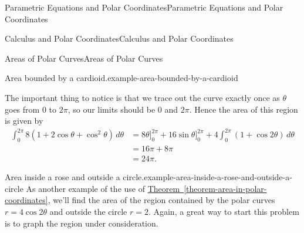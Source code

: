 \documentclass[10pt,]{book}
\numberwithin{equation}{section}
\begin{document}
\begin{chapterptx}{Parametric Equations and Polar Coordinates}{}{Parametric Equations and Polar Coordinates}{}{}
\begin{sectionptx}{Calculus and Polar Coordinates}{}{Calculus and Polar Coordinates}{}{}
\begin{subsectionptx}{Areas of Polar Curves}{}{Areas of Polar Curves}{}{}
\begin{example}{Area bounded by a cardioid.}{example-area-bounded-by-a-cardioid}
\begin{figure}
{
}
\end{figure}
\hypertarget{p-834}{}%
The important thing to notice is that we trace out the curve exactly once as \(\theta\) goes from \(0\) to \(2\pi\), so our limits should be \(0\) and \(2\pi\). Hence the area of this region is given by%
%
\begin{align*}
\int_{0}^{2\pi}8(1+2\cos\theta+\cos^{2}\theta)\,d\theta & = 8\theta\Big]_{0}^{2\pi} + 16\sin\theta\Big]_{0}^{2\pi} + 4\int_{0}^{2\pi}(1+\cos2\theta)\,d\theta \\
& = 16\pi + 8\pi \\
& = 24\pi. 
\end{align*}
\end{example}
\begin{example}{Area inside a rose and outside a circle.}{example-area-inside-a-rose-and-outside-a-circle}%
\hypertarget{p-835}{}%
As another example of the use of \hyperref[theorem-area-in-polar-coordinates]{Theorem~\ref{theorem-area-in-polar-coordinates}}, we'll find the area of the region contained by the polar curves \(r = 4\cos2\theta\) and outside the circle \(r=2\). Again, a great way to start this problem is to graph the region under consideration.%
\begin{figure}
\centering
{
}
\end{figure}
\end{example}
\end{subsectionptx}
\end{sectionptx}
\end{chapterptx}
\end{document}

